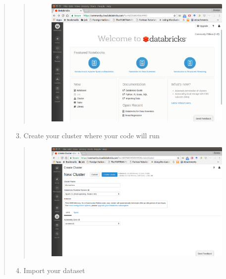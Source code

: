 \documentclass[letterpaper,11pt,english]{sphinxmanual}
\begin{document}
\begin{quote}
\begin{quote}
\begin{figure}[htbp]
\includegraphics{workspace.png}
\label{setup:fig-workspace}\end{figure}
\end{quote}
\begin{enumerate}
\setcounter{enumi}{2}
\item {} 
Create your cluster where your code will run

\end{enumerate}
\begin{quote}
\begin{figure}[htbp]
\centering

\includegraphics{cluster.png}
\label{setup:fig-cluster}\end{figure}
\end{quote}
\begin{enumerate}
\setcounter{enumi}{3}
\item {} 
Import your dataset


\end{enumerate}
\end{quote}
\end{document}
